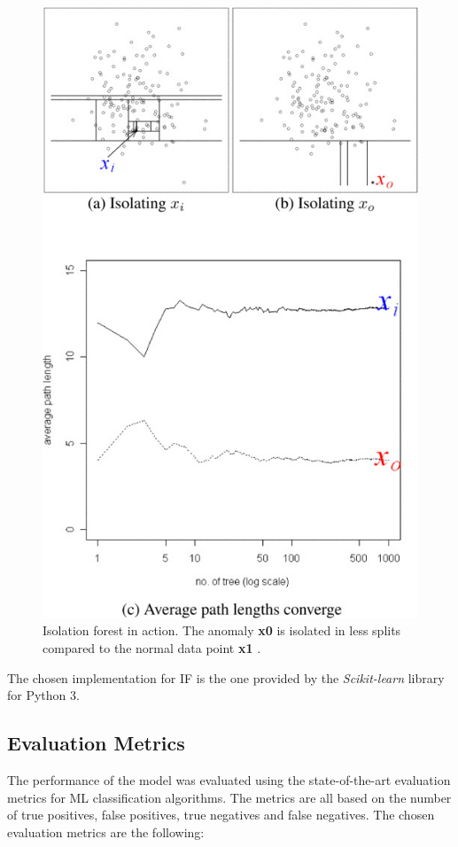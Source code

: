 \documentclass[futureinternet,article,submit,pdftex,moreauthors]{Definitions/mdpi}
\begin{document}
\begin{figure}[H]
	\centering
	\includegraphics[width=6 cm]{img/IsolationForest.jpg}
	\caption{Isolation forest in action. The anomaly \textbf{x0} is isolated in less splits compared to the normal data point \textbf{x1} \cite{IsolationForestLiu}.}
	\label{fig:IsolationForest}
\end{figure}   
\unskip

The chosen implementation for IF is the one provided by the \textit{Scikit-learn} library \cite{IsolationForestScikitLearn} for Python 3. 

\subsection{Evaluation Metrics}\label{EvaluationMetrics}

The performance of the model was evaluated using the state-of-the-art evaluation metrics for ML classification algorithms. The metrics are all based on the number of true positives, false positives, true negatives and false negatives.
The chosen evaluation metrics are the following: 
\end{document}
